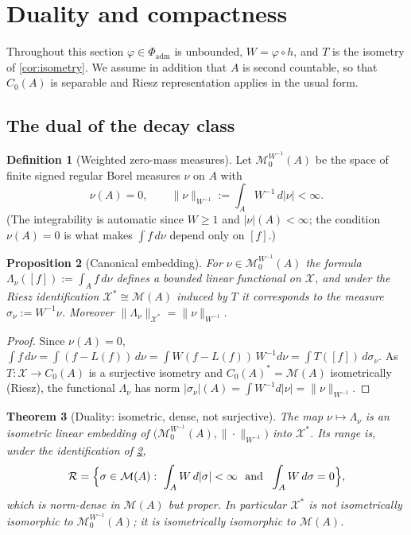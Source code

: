 \documentclass[11pt,a4paper]{article}
\numberwithin{equation}{section}
\theoremstyle{plain}
\newtheorem{theorem}{Theorem}[section]
\newtheorem{proposition}[theorem]{Proposition}
\theoremstyle{definition}
\newtheorem{definition}[theorem]{Definition}
\theoremstyle{remark}
\newcommand{\Cz}{C_0}
\newcommand{\Msp}{\mathcal{M}}
\newcommand{\Xdec}{\mathcal{X}}
\begin{document}
\section{Duality and compactness}
\label{sec:duality}

Throughout this section $\varphi\in\Phi_{\mathrm{adm}}$ is unbounded, $W=\varphi\circ h$,
and $T$ is the isometry of \cref{cor:isometry}. We assume in addition that $A$ is second
countable, so that $\Cz(A)$ is separable and Riesz representation applies in the usual
form.

\subsection{The dual of the decay class}

\begin{definition}[Weighted zero-mass measures]\label{def:M0}
Let $\Msp_0^{W^{-1}}(A)$ be the space of finite signed regular Borel measures $\nu$ on $A$
with
\[
\nu(A)=0,\qquad \|\nu\|_{W^{-1}}:=\int_AW^{-1}\,d|\nu|<\infty .
\]
(The integrability is automatic since $W\ge1$ and $|\nu|(A)<\infty$; the condition
$\nu(A)=0$ is what makes $\int f\,d\nu$ depend only on $[f]$.)
\end{definition}

\begin{proposition}[Canonical embedding]\label{prop:embedding}
For $\nu\in\Msp_0^{W^{-1}}(A)$ the formula $\Lambda_\nu([f]):=\int_Af\,d\nu$ defines a
bounded linear functional on $\Xdec$, and under the Riesz identification
$\Xdec^{\ast}\cong\Msp(A)$ induced by $T$ it corresponds to the measure
$\sigma_\nu:=W^{-1}\nu$. Moreover $\|\Lambda_\nu\|_{\Xdec^{\ast}}=\|\nu\|_{W^{-1}}$.
\end{proposition}

\begin{proof}
Since $\nu(A)=0$, $\int f\,d\nu=\int(f-L(f))\,d\nu=\int W(f-L(f))\,W^{-1}d\nu
=\int T([f])\,d\sigma_\nu$. As $T:\Xdec\to\Cz(A)$ is a surjective isometry and
$\Cz(A)^{\ast}=\Msp(A)$ isometrically (Riesz), the functional $\Lambda_\nu$ has norm
$|\sigma_\nu|(A)=\int W^{-1}d|\nu|=\|\nu\|_{W^{-1}}$.
\end{proof}

\begin{theorem}[Duality: isometric, dense, not surjective]\label{thm:duality}
The map $\nu\mapsto\Lambda_\nu$ is an isometric linear embedding of
$\bigl(\Msp_0^{W^{-1}}(A),\|\cdot\|_{W^{-1}}\bigr)$ into $\Xdec^{\ast}$. Its range is,
under the identification of \cref{prop:embedding},
\[
\mathcal{R}=\Bigl\{\sigma\in\Msp(A):\ \int_AW\,d|\sigma|<\infty\ \text{ and }\ \int_AW\,d\sigma=0\Bigr\},
\]
which is norm-dense in $\Msp(A)$ but proper. In particular $\Xdec^{\ast}$ is
\emph{not} isometrically isomorphic to $\Msp_0^{W^{-1}}(A)$; it is isometrically
isomorphic to $\Msp(A)$.
\end{theorem}
\end{document}
